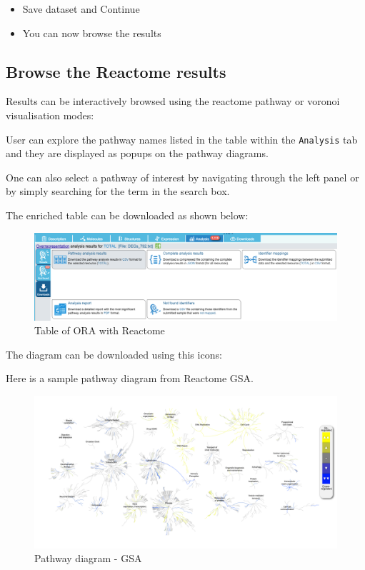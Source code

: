 \documentclass[
]{book}
\begin{document}
\begin{itemize}
\item
  Save dataset and Continue
\item
  You can now browse the results
\end{itemize}

\hypertarget{browse-the-reactome-results}{%
\subsection{Browse the Reactome results}\label{browse-the-reactome-results}}

Results can be interactively browsed using the reactome pathway or voronoi visualisation modes:

User can explore the pathway names listed in the table within the \texttt{Analysis} tab and they are displayed as popups on the pathway diagrams.

One can also select a pathway of interest by navigating through the left panel or by simply searching for the term in the search box.

The enriched table can be downloaded as shown below:

\begin{figure}

{\centering \includegraphics[width=1\linewidth]{images/reactome-download-table} 

}

\caption{Table of ORA with Reactome}\label{fig:unnamed-chunk-32}
\end{figure}

The diagram can be downloaded using this icons:

Here is a sample pathway diagram from Reactome GSA.

\begin{figure}

{\centering \includegraphics[width=1\linewidth]{images/reactome-PathwaysOverview-expression-data} 

}

\caption{Pathway diagram - GSA}\label{fig:unnamed-chunk-33}
\end{figure}
\end{document}
